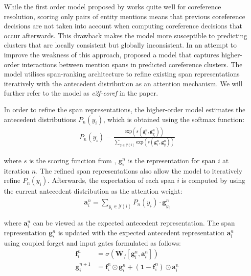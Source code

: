 \documentclass[11pt]{article}
\begin{document}
While the first order model proposed by \textcite{lee2017end} works quite well for coreference resolution, scoring only pairs of entity mentions means that previous coreference decisions are not taken into account when computing coreference decisions that occur afterwards. This drawback makes the model more susceptible to predicting clusters that are locally consistent but globally inconsistent. In an attempt to improve the weakness of this approach, \textcite{lee2018higher} proposed a model that captures higher-order interactions between mention spans in predicted coreference clusters. The model utilises span-ranking architecture to refine existing span representations iteratively with the antecedent distribution as an attention mechanism. We will further refer to the model as \textit{c2f-coref} in the paper.

In order to refine the span representations, the higher-order model estimates the antecedent distributions $P_{n}(y_{i})$, which is obtained using the softmax function:
\begin{align}
P_{n}(y_{i}) = \frac{\text{exp}(s(\pmb{g}_{i}^{n}, \pmb{g}_{y_{i}}^{n}))}{\sum_{y \in \mathcal{Y}(i)} \text{exp}(s(\pmb{g}_{i}^{n}, \pmb{g}_{y}^{n}))}
\end{align}

where $s$ is the scoring function from \textcite{lee2017end}, $\pmb{g}_{i}^{n}$ is the representation for span $i$ at iteration $n$. The refined span representations also allow the model to iteratively refine $P_{n}(y_{i})$. Afterwards, the expectation of each span $i$ is computed by using the current antecedent distribution as the attention weight:
\begin{align}
\pmb{a}_{i}^{n} = \sum\limits_{y_{i} \in \mathcal{Y}(i)} P_{n}(y_{i}) \cdot \pmb{g}_{y_{i}}^{n}
\end{align}

where $\pmb{a}_{i}^{n}$ can be viewed as the expected antecedent representation. The span representation $\pmb{g}_{i}^{n}$ is updated with the expected antecedent representation $\pmb{a}_{i}^{n}$ using coupled forget and input gates formulated as follows:
\begin{align}
\pmb{f}_{i}^{n} &= \sigma(\textbf{W}_{f}[\pmb{g}_{i}^{n}, \pmb{a}_{i}^{n}]) \\
\pmb{g}_{i}^{n+1} &= \pmb{f}_{i}^{n} \odot \pmb{g}_{i}^{n} + (\mathbf{1} - \pmb{f}_{i}^{n}) \odot \pmb{a}_{i}^{n}
\end{align}
\end{document}
